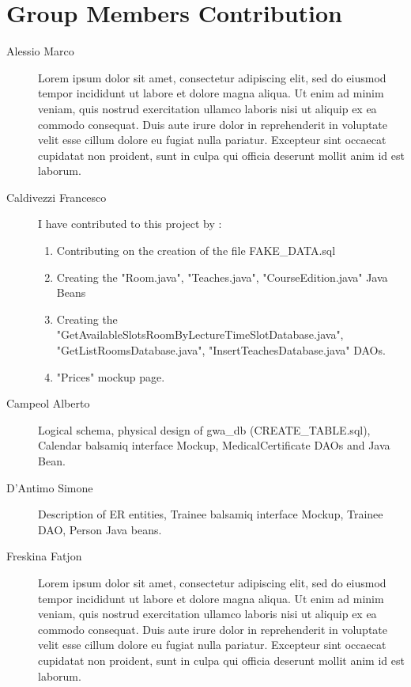 \section{Group Members Contribution}


\begin{description}
	\item[Alessio Marco] Lorem ipsum dolor sit amet, consectetur adipiscing elit, sed do eiusmod tempor incididunt ut labore et dolore magna aliqua. Ut enim ad minim veniam, quis nostrud exercitation ullamco laboris nisi ut aliquip ex ea commodo consequat. Duis aute irure dolor in reprehenderit in voluptate velit esse cillum dolore eu fugiat nulla pariatur. Excepteur sint occaecat cupidatat non proident, sunt in culpa qui officia deserunt mollit anim id est laborum.
	\item[Caldivezzi Francesco] I have contributed to this project by :
	\begin{enumerate}
		\item Contributing on the creation of the file FAKE_DATA.sql
		\item Creating the "Room.java", "Teaches.java", "CourseEdition.java" Java Beans
		\item Creating the "GetAvailableSlotsRoomByLectureTimeSlotDatabase.java", "GetListRoomsDatabase.java", "InsertTeachesDatabase.java" DAOs.
		\item "Prices" mockup page.		
	\end{enumerate}
	\item[Campeol Alberto] Logical schema, physical design of gwa\_db (CREATE_TABLE.sql), Calendar balsamiq interface Mockup, MedicalCertificate DAOs and Java Bean.
	\item[D'Antimo Simone] Description of ER entities, Trainee balsamiq interface Mockup, Trainee DAO, Person Java beans.
	\item[Freskina Fatjon] Lorem ipsum dolor sit amet, consectetur adipiscing elit, sed do eiusmod tempor incididunt ut labore et dolore magna aliqua. Ut enim ad minim veniam, quis nostrud exercitation ullamco laboris nisi ut aliquip ex ea commodo consequat. Duis aute irure dolor in reprehenderit in voluptate velit esse cillum dolore eu fugiat nulla pariatur. Excepteur sint occaecat cupidatat non proident, sunt in culpa qui officia deserunt mollit anim id est laborum.


\end{description}
